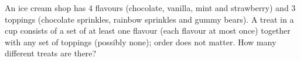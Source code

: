 An ice cream shop has $4$ flavours (chocolate, vanilla, mint and strawberry) and $3$ toppings (chocolate sprinkles, rainbow sprinkles and gummy bears). A treat in a cup consists of a set of at least one flavour (each flavour at most once) together with any set of toppings (possibly none); order does not matter. How many different treats are there?
